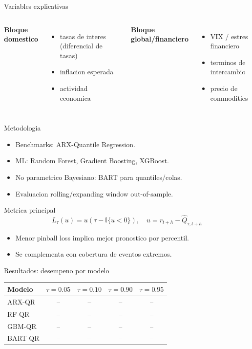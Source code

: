 ﻿\documentclass[aspectratio=169,10pt]{beamer}
\begin{document}
\begin{frame}{Variables explicativas}
\begin{columns}[T]
\textbf{Bloque domestico}
\begin{itemize}
    \item tasas de interes (diferencial de tasas)
    \item inflacion esperada
    \item actividad economica
\end{itemize}

\textbf{Bloque global/financiero}
\begin{itemize}
    \item VIX / estres financiero
    \item terminos de intercambio
    \item precio de commodities
\end{itemize}
\end{columns}
\end{frame}

\begin{frame}{Metodologia}
\begin{itemize}
    \item Benchmarks: ARX-Quantile Regression.
    \item ML: Random Forest, Gradient Boosting, XGBoost.
    \item No parametrico Bayesiano: BART para quantiles/colas.
    \item Evaluacion rolling/expanding window out-of-sample.
\end{itemize}
\end{frame}

\begin{frame}{Metrica principal}
\begin{equation*}
L_{\tau}(u)=u\left(\tau-\mathbb{I}\{u<0\}\right),\quad u=r_{t+h}-\hat{Q}_{\tau,t+h}
\end{equation*}

\begin{itemize}
    \item Menor pinball loss implica mejor pronostico por percentil.
    \item Se complementa con cobertura de eventos extremos.
\end{itemize}
\end{frame}

\begin{frame}{Resultados: desempeno por modelo}
\begin{table}
\centering
\begin{tabular}{lcccc}
\toprule
Modelo & $\tau=0.05$ & $\tau=0.10$ & $\tau=0.90$ & $\tau=0.95$ \\
\midrule
ARX-QR & -- & -- & -- & -- \\
RF-QR & -- & -- & -- & -- \\
GBM-QR & -- & -- & -- & -- \\
BART-QR & -- & -- & -- & -- \\
\bottomrule
\end{tabular}
\end{table}
\end{frame}
\end{document}
